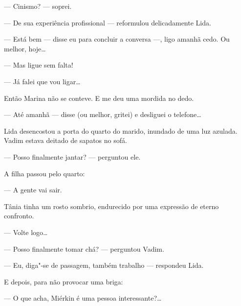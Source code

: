 --- Cinismo? --- soprei.

--- De sua experiência profissional --- reformulou delicadamente Lida.

--- Está bem --- disse eu para concluir a conversa ---, ligo amanhã
cedo. Ou melhor, hoje\ldots{}

--- Mas ligue sem falta!

--- Já falei que vou ligar\ldots{}

Então Marina não se conteve. E me deu uma mordida no dedo.

--- Até amanhã --- disse (ou melhor, gritei) e desliguei o telefone\ldots{}

Lida desencostou a porta do quarto do marido, inundado de uma luz
azulada. Vadim estava deitado de sapatos no sofá.

--- Posso finalmente jantar? --- perguntou ele.

A filha passou pelo quarto:

--- A gente vai sair.

Tânia tinha um rosto sombrio, endurecido por uma expressão de eterno
confronto.

--- Volte logo\ldots{}

--- Posso finalmente tomar chá? --- perguntou Vadim.

--- Eu, diga"-se de passagem, também trabalho --- respondeu Lida.

E depois, para não provocar uma briga:

--- O que acha, Miérkin é uma pessoa interessante?\ldots{}

\movetooddpage
\begin{center}
{}
\end{center}

